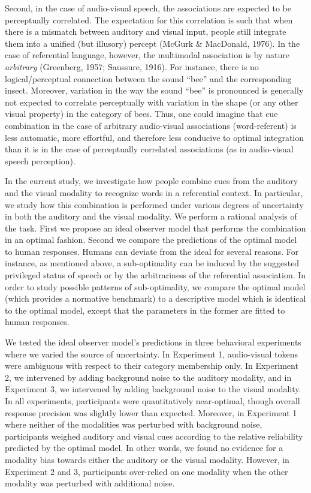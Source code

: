 \documentclass[english,man]{apa6}
\theoremstyle{definition}
\theoremstyle{definition}
\theoremstyle{definition}
\theoremstyle{remark}
\begin{document}
Second, in the case of audio-visual speech, the associations are
expected to be perceptually correlated. The expectation for this
correlation is such that when there is a mismatch between auditory and
visual input, people still integrate them into a unified (but illusory)
percept (McGurk \& MacDonald, 1976). In the case of referential
language, however, the multimodal association is by nature
\emph{arbitrary} (Greenberg, 1957; Saussure, 1916). For instance, there
is no logical/perceptual connection between the sound \enquote{bee} and
the corresponding insect. Moreover, variation in the way the sound
\enquote{bee} is pronounced is generally not expected to correlate
perceptually with variation in the shape (or any other visual property)
in the category of bees. Thus, one could imagine that cue combination in
the case of arbitrary audio-visual associations (word-referent) is less
automatic, more effortful, and therefore less conducive to optimal
integration than it is in the case of perceptually correlated
associations (as in audio-visual speech perception).

In the current study, we investigate how people combine cues from the
auditory and the visual modality to recognize words in a referential
context. In particular, we study how this combination is performed under
various degrees of uncertainty in both the auditory and the visual
modality. We perform a rational analysis of the task. First we propose
an ideal observer model that performs the combination in an optimal
fashion. Second we compare the predictions of the optimal model to human
responses. Humans can deviate from the ideal for several reasons. For
instance, as mentioned above, a sub-optimality can be induced by the
suggested privileged status of speech or by the arbitrariness of the
referential association. In order to study possible patterns of
sub-optimality, we compare the optimal model (which provides a normative
benchmark) to a descriptive model which is identical to the optimal
model, except that the parameters in the former are fitted to human
responses.

We tested the ideal observer model's predictions in three behavioral
experiments where we varied the source of uncertainty. In Experiment 1,
audio-visual tokens were ambiguous with respect to their category
membership only. In Experiment 2, we intervened by adding background
noise to the auditory modality, and in Experiment 3, we intervened by
adding background noise to the visual modality. In all experiments,
participants were quantitatively near-optimal, though overall response
precision was slightly lower than expected. Moreover, in Experiment 1
where neither of the modalities was perturbed with background noise,
participants weighed auditory and visual cues according to the relative
reliability predicted by the optimal model. In other words, we found no
evidence for a modality bias towards either the auditory or the visual
modality. However, in Experiment 2 and 3, participants over-relied on
one modality when the other modality was perturbed with additional
noise.
\end{document}
